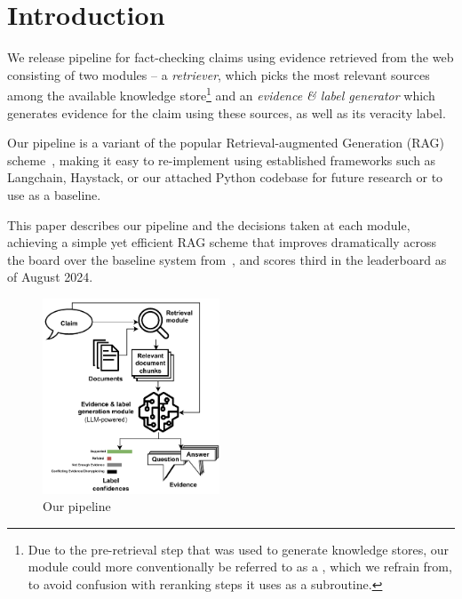 
\section{Introduction}
\label{sec:introduction}
We release pipeline for fact-checking claims using evidence retrieved from the web consisting of two modules -- a \textit{retriever}, which picks the most relevant sources among the available knowledge store\footnote{Due to the pre-retrieval step that was used to generate knowledge stores, our  module could more conventionally be referred to as a , which we refrain from, to avoid confusion with reranking steps it uses as a subroutine.} and an \textit{evidence \& label generator} which generates evidence for the claim using these sources, as well as its veracity label. 

Our pipeline is a variant of the popular Retrieval-augmented Generation (RAG) scheme~\cite{rag}, making it easy to re-implement using established frameworks such as Langchain, Haystack, or our attached Python codebase for future research or to use as a baseline.

This paper describes our pipeline and the decisions taken at each module, achieving a simple yet efficient RAG scheme that improves dramatically across the board over the baseline system from~\cite{averitec2024}, and scores third in the \averitec{}  leaderboard as of August 2024.

\begin{figure}[h]
    \centering
    \includegraphics[width=0.47\textwidth]{figures/pipeline.pdf}
    \caption{Our pipeline}
    \label{fig:pipeline}
\end{figure}

